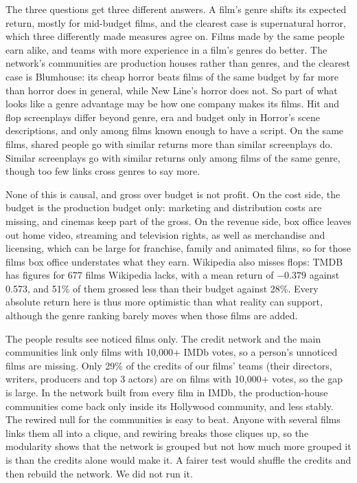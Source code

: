 \documentclass[9pt,twocolumn,twoside]{pnas-new}
\begin{document}
The three questions get three different answers. A film's genre shifts its expected return, mostly for mid-budget films, and the clearest case is supernatural horror, which three differently made measures agree on. Films made by the same people earn alike, and teams with more experience in a film's genres do better. The network's communities are production houses rather than genres, and the clearest case is Blumhouse: its cheap horror beats films of the same budget by far more than horror does in general, while New Line's horror does not. So part of what looks like a genre advantage may be how one company makes its films. Hit and flop screenplays differ beyond genre, era and budget only in Horror's scene descriptions, and only among films known enough to have a script. On the same films, shared people go with similar returns more than similar screenplays do. Similar screenplays go with similar returns only among films of the same genre, though too few links cross genres to say more.

None of this is causal, and gross over budget is not profit. On the cost side, the budget is the production budget only: marketing and distribution costs are missing, and cinemas keep part of the gross. On the revenue side, box office leaves out home video, streaming and television rights, as well as merchandise and licensing, which can be large for franchise, family and animated films, so for those films box office understates what they earn. Wikipedia also misses flops: TMDB has figures for 677 films Wikipedia lacks, with a mean return of $-0.379$ against 0.573, and 51\% of them grossed less than their budget against 28\%. Every absolute return here is thus more optimistic than what reality can support, although the genre ranking barely moves when those films are added.

The people results see noticed films only. The credit network and the main communities link only films with 10,000+ IMDb votes, so a person's unnoticed films are missing. Only 29\% of the credits of our films' teams (their directors, writers, producers and top 3 actors) are on films with 10,000+ votes, so the gap is large. In the network built from every film in IMDb, the production-house communities come back only inside its Hollywood community, and less stably. The rewired null for the communities is easy to beat. Anyone with several films links them all into a clique, and rewiring breaks those cliques up, so the modularity shows that the network is grouped but not how much more grouped it is than the credits alone would make it. A fairer test would shuffle the credits and then rebuild the network. We did not run it.
\end{document}
